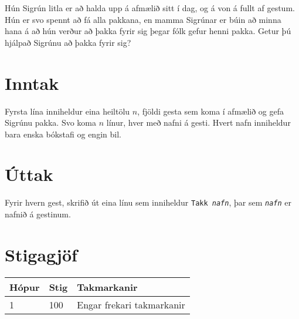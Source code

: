 %
Hún Sigrún litla er að halda upp á afmælið sitt í dag, og á von á fullt af
gestum. Hún er svo spennt að fá alla pakkana, en mamma Sigrúnar er búin að
minna hana á að hún verður að þakka fyrir sig þegar fólk gefur henni pakka.
Getur þú hjálpað Sigrúnu að þakka fyrir sig?

\section*{Inntak}
Fyrsta lína inniheldur eina heiltölu $n$, fjöldi gesta sem koma í afmælið og
gefa Sigrúnu pakka. Svo koma $n$ línur, hver með nafni á gesti. Hvert nafn
inniheldur bara enska bókstafi og engin bil.

\section*{Úttak}
Fyrir hvern gest, skrifið út eina línu sem inniheldur \texttt{Takk
\textit{nafn}}, þar sem \texttt{\textit{nafn}} er nafnið á gestinum.

\section*{Stigagjöf}
\begin{tabular}{|l|l|l|}
\hline
Hópur & Stig & Takmarkanir \\ \hline
1     & 100  & Engar frekari takmarkanir\\ \hline
\end{tabular}
